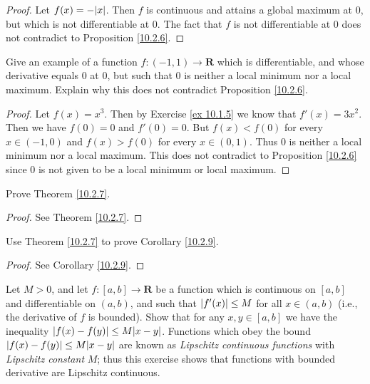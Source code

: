 \begin{proof}
    Let \(f(x) = -\abs*{x}\).
    Then \(f\) is continuous and attains a global maximum at \(0\), but which is not differentiable at \(0\).
    The fact that \(f\) is not differentiable at \(0\) does not contradict to Proposition \ref{10.2.6}.
\end{proof}

\begin{exercise}\label{ex 10.2.3}
    Give an example of a function \(f : (-1, 1) \to \mathbf{R}\) which is differentiable, and whose derivative equals \(0\) at \(0\), but such that \(0\) is neither a local minimum nor a local maximum.
    Explain why this does not contradict Proposition \ref{10.2.6}.
\end{exercise}

\begin{proof}
    Let \(f(x) = x^3\).
    Then by Exercise \ref{ex 10.1.5} we know that \(f'(x) = 3x^2\).
    Then we have \(f(0) = 0\) and \(f'(0) = 0\).
    But \(f(x) < f(0)\) for every \(x \in (-1, 0)\) and \(f(x) > f(0)\) for every \(x \in (0, 1)\).
    Thus \(0\) is neither a local minimum nor a local maximum.
    This does not contradict to Proposition \ref{10.2.6} since \(0\) is not given to be a local minimum or local maximum.
\end{proof}

\begin{exercise}\label{ex 10.2.4}
    Prove Theorem \ref{10.2.7}.
\end{exercise}

\begin{proof}
    See Theorem \ref{10.2.7}.
\end{proof}

\begin{exercise}\label{ex 10.2.5}
    Use Theorem \ref{10.2.7} to prove Corollary \ref{10.2.9}.
\end{exercise}

\begin{proof}
    See Corollary \ref{10.2.9}.
\end{proof}

\begin{exercise}\label{ex 10.2.6}
    Let \(M > 0\), and let \(f : [a, b] \to \mathbf{R}\) be a function which is continuous on \([a, b]\) and differentiable on \((a, b)\), and such that \(\abs*{f'(x)} \leq M\) for all \(x \in (a, b)\) (i.e., the derivative of \(f\) is bounded).
    Show that for any \(x, y \in [a, b]\) we have the inequality \(\abs*{f(x) - f(y)} \leq M \abs*{x - y}\).
    Functions which obey the bound \(\abs*{f(x) - f(y)} \leq M \abs*{x - y}\) are known as \emph{Lipschitz continuous functions} with \emph{Lipschitz constant} \(M\);
    thus this exercise shows that functions with bounded derivative are Lipschitz continuous.
\end{exercise}

